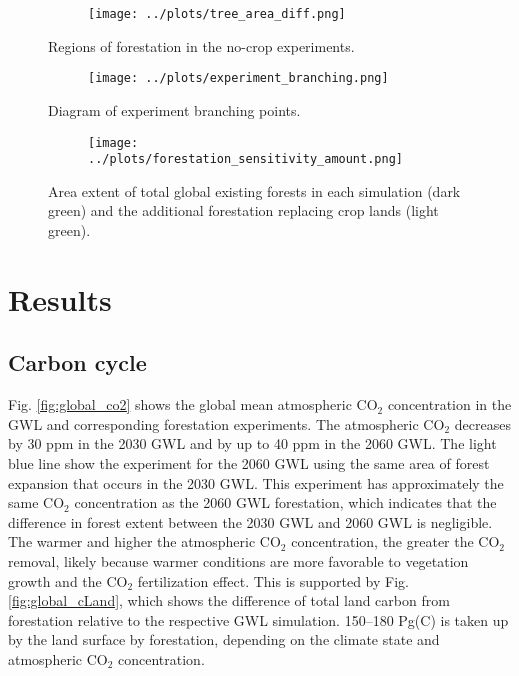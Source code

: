 \documentclass[]{article}
\begin{document}
\begin{figure}[H]
    \centering
    \begin{subfigure}[b]{\linewidth}
        \texttt{[image: ../plots/tree\_area\_diff.png]}
    \end{subfigure}
    \caption{Regions of forestation in the no-crop experiments.}
    \label{fig:forestation_on_crops}
\end{figure}

\begin{figure}[H]
    \centering
    \begin{subfigure}[b]{\linewidth}
        \texttt{[image: ../plots/experiment\_branching.png]}
    \end{subfigure}
    \caption{Diagram of experiment branching points.}
    \label{fig:experiment_branching}
\end{figure}

\begin{figure}[H]
    \centering
    \begin{subfigure}[b]{\linewidth}
        \texttt{[image: ../plots/forestation\_sensitivity\_amount.png]}
    \end{subfigure}
    \caption{Area extent of total global existing forests in each simulation (dark green) and the additional forestation replacing crop lands (light green).}
    \label{fig:forestation_ammount}
\end{figure}

\section{Results}

\subsection{Carbon cycle}

Fig. \ref{fig:global_co2} shows the global mean atmospheric CO$_2$ concentration in the GWL and corresponding forestation experiments.
The atmospheric CO$_2$ decreases by 30 ppm in the 2030 GWL and by up to 40 ppm in the 2060 GWL.
The light blue line show the experiment for the 2060 GWL using the same area of forest expansion that occurs in the 2030 GWL. This experiment has approximately the same CO$_2$ concentration as the 2060 GWL forestation, which indicates that the difference in forest extent between the 2030 GWL and 2060 GWL is negligible.
The warmer and higher the atmospheric CO$_2$ concentration, the greater the CO$_2$ removal, likely because warmer conditions are more favorable to vegetation growth and the CO$_2$ fertilization effect.
This is supported by Fig. \ref{fig:global_cLand}, which shows the difference of total land carbon from forestation relative to the respective GWL simulation.
150–180 Pg(C) is taken up by the land surface by forestation, depending on the climate state and atmospheric CO$_2$ concentration.
\end{document}
